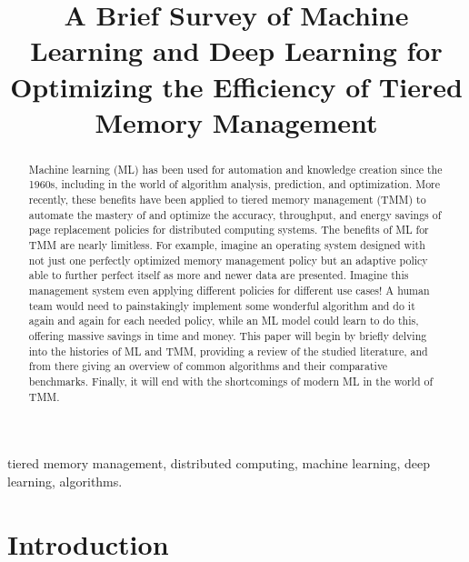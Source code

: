 \documentclass[conference]{IEEEtran}
\begin{document}
\title{A Brief Survey of Machine Learning and Deep Learning for Optimizing the Efficiency of Tiered Memory Management}

\author{
}

\maketitle

\begin{abstract}
    Machine learning (ML) has been used for automation and knowledge creation since the 1960s, 
    including in the world of algorithm analysis, prediction, and optimization.  More recently, 
    these benefits have been applied to tiered memory management (TMM) to automate the mastery of and optimize the accuracy, throughput, and energy savings of page replacement policies for distributed computing systems.  The benefits of ML for TMM are nearly limitless.  For example, imagine an operating system designed with not just one perfectly optimized memory management policy but an adaptive policy able to further perfect itself as more and newer data are presented.  Imagine this management system even applying different policies for different use cases!  A human team would need to painstakingly implement some wonderful algorithm and do it again and again for each needed policy, while an ML model could learn to do this, offering massive savings in time and money.  This paper will begin by briefly delving into the histories of ML and TMM, providing a review of the studied literature, and from there giving an overview of common algorithms and their comparative benchmarks.  Finally, it will end with the shortcomings of modern ML in the world of TMM. 
\end{abstract}

\begin{IEEEkeywords}
tiered memory management, distributed computing, machine learning, deep learning, algorithms.
\end{IEEEkeywords}

\section{Introduction}
\end{document}
